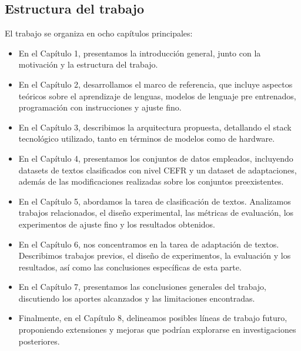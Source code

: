 \subsection{Estructura del trabajo}
El trabajo se organiza en ocho capítulos principales:
\begin{itemize}
\item En el Capítulo 1, presentamos la introducción general, junto con la motivación y la estructura del trabajo.
\item En el Capítulo 2, desarrollamos el marco de referencia, que incluye aspectos teóricos sobre el aprendizaje de lenguas, modelos de lenguaje pre entrenados, programación con instrucciones y ajuste fino.
\item En el Capítulo 3, describimos la arquitectura propuesta, detallando el stack tecnológico utilizado, tanto en términos de modelos como de hardware.
\item En el Capítulo 4, presentamos los conjuntos de datos empleados, incluyendo datasets de textos clasificados con nivel CEFR y un dataset de adaptaciones, además de las modificaciones realizadas sobre los conjuntos preexistentes.
\item En el Capítulo 5, abordamos la tarea de clasificación de textos. Analizamos trabajos relacionados, el diseño experimental, las métricas de evaluación, los experimentos de ajuste fino y los resultados obtenidos.
\item En el Capítulo 6, nos concentramos en la tarea de adaptación de textos. Describimos trabajos previos, el diseño de experimentos, la evaluación y los resultados, así como las conclusiones específicas de esta parte.
\item En el Capítulo 7, presentamos las conclusiones generales del trabajo, discutiendo los aportes alcanzados y las limitaciones encontradas.
\item Finalmente, en el Capítulo 8, delineamos posibles líneas de trabajo futuro, proponiendo extensiones y mejoras que podrían explorarse en investigaciones posteriores.
\end{itemize}